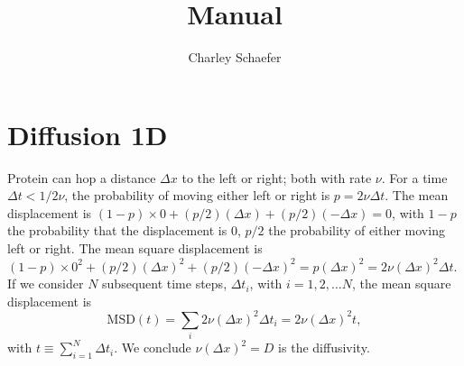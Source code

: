 \documentclass[a4paper, 11 pt]{article}
\title{Manual}
\author{Charley Schaefer}
\begin{document}
 \maketitle
 \date{}
  \section{Diffusion 1D}
  Protein can hop a distance $\Delta x$ to the left or right; both with rate $\nu$.
  For a time $\Delta t<1/2\nu$, the probability of moving either left or right is $p=2\nu\Delta t$. The mean displacement is $(1-p)\times 0 + (p/2)(\Delta x) +(p/2)(-\Delta x)=0$, with $1-p$ the probability that the displacement is $0$, $p/2$ the probability of either moving left or right.
The mean square displacement is $(1-p)\times 0^2 + (p/2)(\Delta x)^2 +(p/2)(-\Delta x)^2=p(\Delta x)^2 = 2\nu (\Delta x)^2 \Delta t$.
  If we consider $N$ subsequent time steps, $\Delta t_i$, with $i=1,2,\dots N$, the mean square displacement is
\begin{equation}
  \mathrm{MSD}(t) = \sum_{i} 2\nu (\Delta x)^2 \Delta t_i
= 2\nu (\Delta x)^2 t,
\end{equation}
with $t\equiv \sum_{i=1}^{N} \Delta t_i$. We conclude $\nu (\Delta x)^2 = D$ is the diffusivity.
\end{document}

